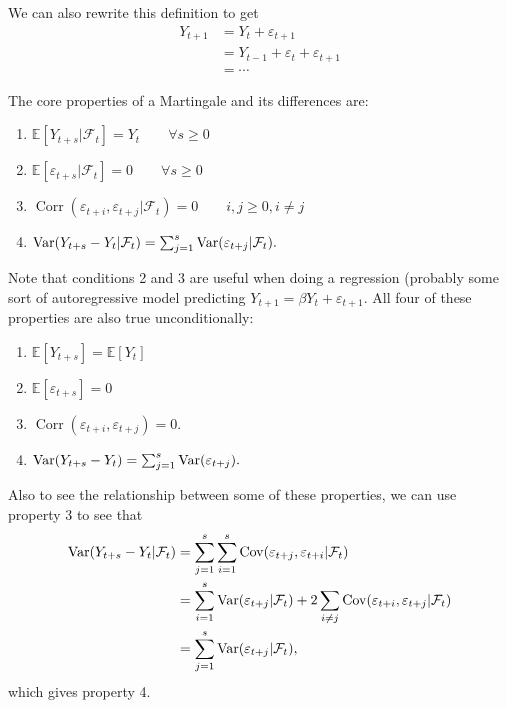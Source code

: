 
We can also rewrite this definition to get \begin{align*}
	Y_{t+1} &= Y_t + \varepsilon_{t+1} \\ 
			&= Y_{t-1} + \varepsilon_t + \varepsilon_{t+1} \\
			&= \cdots
\end{align*} 

The core properties of a Martingale and its differences are: \begin{enumerate}
	\item $\mathbb E[Y_{t+s}|\mathcal F_t] = Y_t\qquad\forall s\geq 0$
	\item $\mathbb E[\varepsilon_{t+s}|\mathcal F_t] = 0\qquad\forall s\geq 0$
	\item $\operatorname{Corr}(\varepsilon_{t+i},\varepsilon_{t+j}|\mathcal F_t)=0\qquad i,j\geq 0, i\neq j$
	\item $\operatorname{Var}(Y_{t+s}-Y_t|\mathcal F_t) = \sum_{j=1}^{s} \operatorname{Var}(\varepsilon_{t+j}|\mathcal F_t). $
\end{enumerate} Note that conditions 2 and 3 are useful when doing a regression (probably some sort of autoregressive model predicting $Y_{t+1}=\beta Y_t+\varepsilon_{t+1}$. All four of these properties are also true unconditionally: \begin{enumerate}
	\item $\mathbb E[Y_{t+s}] = \mathbb E[Y_t]$
	\item $\mathbb E[\varepsilon_{t+s}] = 0$
	\item $\operatorname{Corr}(\varepsilon_{t+i},\varepsilon_{t+j}) = 0$.
	\item $\operatorname{Var}(Y_{t+s}-Y_t) = \sum_{j=1}^{s} \operatorname{Var}(\varepsilon_{t+j}). $
\end{enumerate} 
Also to see the relationship between some of these properties, we can use property 3 to see that \begin{align*}
	\operatorname{Var}(Y_{t+s}-Y_t|\mathcal F_t) &= \sum_{j=1}^{s} \sum_{i=1}^{s} \operatorname{Cov}(\varepsilon_{t+j},\varepsilon_{t+i}|\mathcal F_t)   \\
								   &= \sum_{i=1}^{s} \operatorname{Var}(\varepsilon_{t+j}|\mathcal F_t) + 2 \sum_{i\neq j}^{} \operatorname{Cov}(\varepsilon_{t+i},\varepsilon_{t+j}|\mathcal F_t) \\
								   &= \sum_{j=1}^{s} \operatorname{Var}(\varepsilon_{t+j}|\mathcal F_t), 
\end{align*} which gives property 4.

